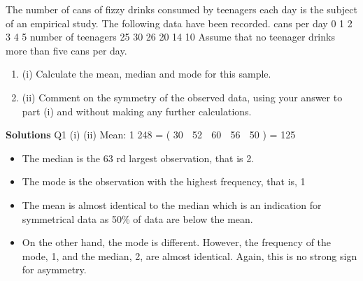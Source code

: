 \documentclass[a4paper,12pt]{article}
\begin{document}
The number of cans of fizzy drinks consumed by teenagers each day is the subject of
an empirical study. The following data have been recorded.
cans per day 0 1 2 3 4 5
number of teenagers 25 30 26 20 14 10
Assume that no teenager drinks more than five cans per day.
\begin{enumerate}
\item (i) Calculate the mean, median and mode for this sample.
\item (ii) Comment on the symmetry of the observed data, using your answer to part (i)
and without making any further calculations.
\end{enumerate}
\noindent \textbf{Solutions}
Q1
(i)
(ii)
Mean:
1
248
\;=
( 30  52  60  56  50 ) \;=
125

\begin{itemize}
    \item The median is the 63 rd largest observation, that is 2. 
\item The mode is the observation with the highest frequency, that is, 1 
\item The mean is almost identical to the median which is an indication for
symmetrical data as 50\% of data are below the mean. 
\item On the other hand, the mode is different. However, the frequency of the mode,
1, and the median, 2, are almost identical. Again, this is no strong sign for
asymmetry.
\end{itemize}


\end{document}
